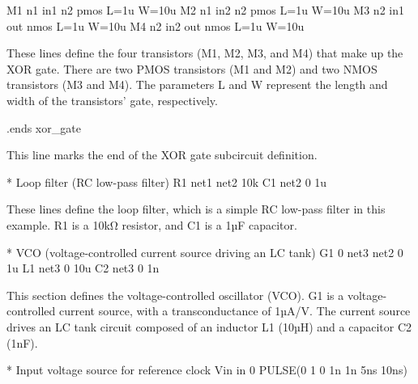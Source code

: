 \documentclass[
]{article}
\newenvironment{Shaded}{}{}
\newcommand{\NormalTok}[1]{#1}
\begin{document}
\begin{Shaded}
\begin{Highlighting}[]
\NormalTok{  M1 n1 in1 n2 pmos L=1u W=10u}
\NormalTok{  M2 n1 in2 n2 pmos L=1u W=10u}
\NormalTok{  M3 n2 in1 out nmos L=1u W=10u}
\NormalTok{  M4 n2 in2 out nmos L=1u W=10u}
\end{Highlighting}
\end{Shaded}

These lines define the four transistors (M1, M2, M3, and M4) that make
up the XOR gate. There are two PMOS transistors (M1 and M2) and two NMOS
transistors (M3 and M4). The parameters L and W represent the length and
width of the transistors' gate, respectively.

\begin{Shaded}
\begin{Highlighting}[]
\NormalTok{.ends xor\_gate}
\end{Highlighting}
\end{Shaded}

This line marks the end of the XOR gate subcircuit definition.

\begin{Shaded}
\begin{Highlighting}[]
\NormalTok{* Loop filter (RC low{-}pass filter)}
\NormalTok{R1 net1 net2 10k}
\NormalTok{C1 net2 0 1u}
\end{Highlighting}
\end{Shaded}

These lines define the loop filter, which is a simple RC low-pass filter
in this example. R1 is a 10kΩ resistor, and C1 is a 1µF capacitor.

\begin{Shaded}
\begin{Highlighting}[]
\NormalTok{* VCO (voltage{-}controlled current source driving an LC tank)}
\NormalTok{G1 0 net3 net2 0 1u}
\NormalTok{L1 net3 0 10u}
\NormalTok{C2 net3 0 1n}
\end{Highlighting}
\end{Shaded}

This section defines the voltage-controlled oscillator (VCO). G1 is a
voltage-controlled current source, with a transconductance of 1µA/V. The
current source drives an LC tank circuit composed of an inductor L1
(10µH) and a capacitor C2 (1nF).

\begin{Shaded}
\begin{Highlighting}[]
\NormalTok{* Input voltage source for reference clock}
\NormalTok{Vin in 0 PULSE(0 1 0 1n 1n 5ns 10ns)}
\end{Highlighting}
\end{Shaded}
\end{document}
